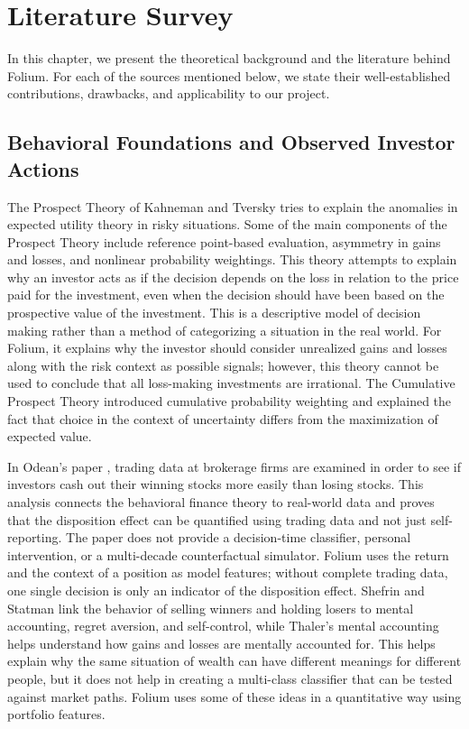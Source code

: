 \chapter{Literature Survey}
In this chapter, we present the theoretical background and the literature behind Folium. For each of the sources mentioned below, we state their well-established contributions, drawbacks, and applicability to our project.

\section{Behavioral Foundations and Observed Investor Actions}
The Prospect Theory of Kahneman and Tversky \cite{b1} tries to explain the anomalies in expected utility theory in risky situations. Some of the main components of the Prospect Theory include reference point-based evaluation, asymmetry in gains and losses, and nonlinear probability weightings. This theory attempts to explain why an investor acts as if the decision depends on the loss in relation to the price paid for the investment, even when the decision should have been based on the prospective value of the investment. This is a descriptive model of decision making rather than a method of categorizing a situation in the real world. For Folium, it explains why the investor should consider unrealized gains and losses along with the risk context as possible signals; however, this theory cannot be used to conclude that all loss-making investments are irrational. The Cumulative Prospect Theory \cite{b17} introduced cumulative probability weighting and explained the fact that choice in the context of uncertainty differs from the maximization of expected value.

In Odean's paper \cite{b2}, trading data at brokerage firms are examined in order to see if investors cash out their winning stocks more easily than losing stocks. This analysis connects the behavioral finance theory to real-world data and proves that the disposition effect can be quantified using trading data and not just self-reporting. The paper does not provide a decision-time classifier, personal intervention, or a multi-decade counterfactual simulator. Folium uses the return and the context of a position as model features; without complete trading data, one single decision is only an indicator of the disposition effect. Shefrin and Statman \cite{b4} link the behavior of selling winners and holding losers to mental accounting, regret aversion, and self-control, while Thaler's mental accounting \cite{b18} helps understand how gains and losses are mentally accounted for. This helps explain why the same situation of wealth can have different meanings for different people, but it does not help in creating a multi-class classifier that can be tested against market paths. Folium uses some of these ideas in a quantitative way using portfolio features.

